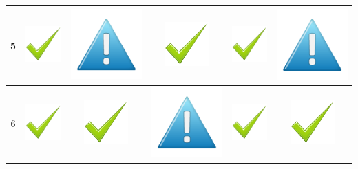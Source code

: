 \documentclass[12pt]{article}
\begin{document}
\begin{center}
\begin{tabular}{*{6}{|c}|}
    5 & \includegraphics[scale=0.2]{Billeder/godt}& \includegraphics[scale=0.1]{Billeder/mindre} &  \includegraphics[scale=0.2]{Billeder/godt}& \includegraphics[scale=0.2]{Billeder/godt}&  \includegraphics[scale=0.1]{Billeder/mindre}\\
     & \includegraphics[scale=0.2]{Billeder/godt}&  \includegraphics[scale=0.2]{Billeder/godt}&  \includegraphics[scale=0.1]{Billeder/mindre}& \includegraphics[scale=0.2]{Billeder/godt}& \includegraphics[scale=0.2]{Billeder/godt}\\

\end{tabular}
\end{center}
\end{document}
